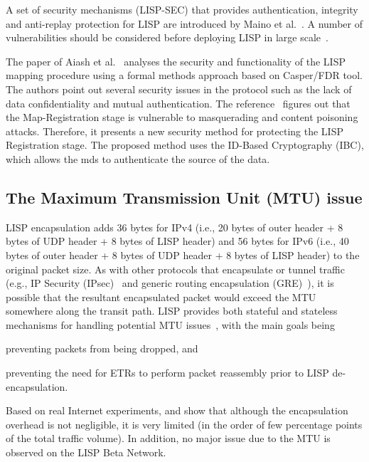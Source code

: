 A set of security mechanisms (LISP-SEC) that provides authentication, integrity and anti-replay protection for LISP are introduced by Maino et al.~\cite{maino2017lisp}. A number of vulnerabilities should be considered before deploying LISP in large scale~\cite{raheem2013supporting}.

The paper of Aiash et al.~\cite{aiash2013novel} analyses the security and functionality of the LISP mapping procedure using a formal methods approach based on Casper/FDR tool. The authors point out several security issues in the protocol such as the lack of data confidentiality and mutual authentication. The reference~\cite{aiash2013securing} figures out that the Map-Registration stage is vulnerable to masquerading and content poisoning attacks. Therefore, it presents a new security method for protecting the LISP Registration stage. The proposed method uses the ID-Based Cryptography (IBC), which allows the \acrshort{mds} to authenticate the source of the data. 

\subsection{The Maximum Transmission Unit (MTU) issue}
\label{subsubsec:mtu}
LISP encapsulation adds 36 bytes for IPv4 (i.e., 20 bytes of outer header + 8 bytes of UDP header + 8 bytes of LISP header) and 56 bytes for IPv6 (i.e., 40 bytes of outer header + 8 bytes of UDP header + 8 bytes of LISP header) to the original packet size. As with other protocols that encapsulate or tunnel traffic (e.g., IP Security (IPsec)~\cite{thayer1998rfc} and generic routing encapsulation (GRE)~\cite{farinacci2000generic}), it is possible that the resultant encapsulated packet would exceed the MTU somewhere along the transit path. LISP provides both stateful and stateless mechanisms for handling potential MTU issues~\cite{CiscoLISPQA}, with the main goals being 
\begin{enumerate*}[label=(\roman*)]
	\item preventing packets from being dropped, and
	\item preventing the need for ETRs to perform packet reassembly prior to LISP de-encapsulation. 
\end{enumerate*}

Based on real Internet experiments, \cite{lispCacheCost} and \cite{kim2013caching} show that although the encapsulation overhead is not negligible, it is very limited (in the order of few percentage points of the total traffic volume). In addition, no major issue due to the MTU is observed on the LISP Beta Network.


